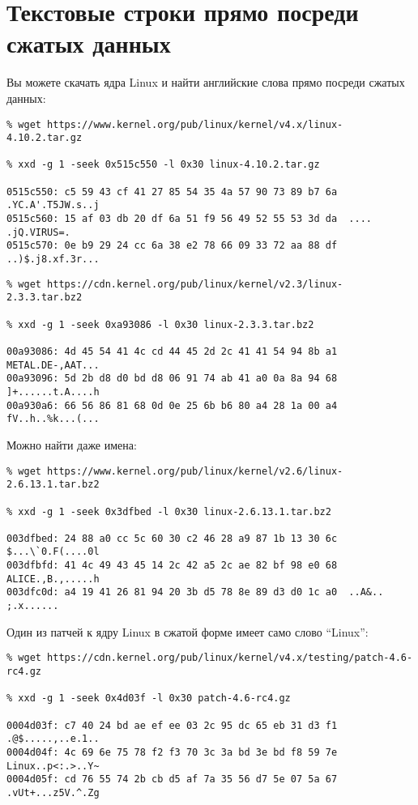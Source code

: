 \section{Текстовые строки прямо посреди сжатых данных}

Вы можете скачать ядра Linux и найти английские слова прямо посреди сжатых данных:

\begin{lstlisting}
% wget https://www.kernel.org/pub/linux/kernel/v4.x/linux-4.10.2.tar.gz

% xxd -g 1 -seek 0x515c550 -l 0x30 linux-4.10.2.tar.gz

0515c550: c5 59 43 cf 41 27 85 54 35 4a 57 90 73 89 b7 6a  .YC.A'.T5JW.s..j
0515c560: 15 af 03 db 20 df 6a 51 f9 56 49 52 55 53 3d da  .... .jQ.VIRUS=.
0515c570: 0e b9 29 24 cc 6a 38 e2 78 66 09 33 72 aa 88 df  ..)$.j8.xf.3r...
\end{lstlisting}

\begin{lstlisting}
% wget https://cdn.kernel.org/pub/linux/kernel/v2.3/linux-2.3.3.tar.bz2

% xxd -g 1 -seek 0xa93086 -l 0x30 linux-2.3.3.tar.bz2

00a93086: 4d 45 54 41 4c cd 44 45 2d 2c 41 41 54 94 8b a1  METAL.DE-,AAT...
00a93096: 5d 2b d8 d0 bd d8 06 91 74 ab 41 a0 0a 8a 94 68  ]+......t.A....h
00a930a6: 66 56 86 81 68 0d 0e 25 6b b6 80 a4 28 1a 00 a4  fV..h..%k...(...
\end{lstlisting}

Можно найти даже имена:

\begin{lstlisting}
% wget https://www.kernel.org/pub/linux/kernel/v2.6/linux-2.6.13.1.tar.bz2

% xxd -g 1 -seek 0x3dfbed -l 0x30 linux-2.6.13.1.tar.bz2

003dfbed: 24 88 a0 cc 5c 60 30 c2 46 28 a9 87 1b 13 30 6c  $...\`0.F(....0l
003dfbfd: 41 4c 49 43 45 14 2c 42 a5 2c ae 82 bf 98 e0 68  ALICE.,B.,.....h
003dfc0d: a4 19 41 26 81 94 20 3b d5 78 8e 89 d3 d0 1c a0  ..A&.. ;.x......
\end{lstlisting}

Один из патчей к ядру Linux в сжатой форме имеет само слово ``Linux'':

\begin{lstlisting}
% wget https://cdn.kernel.org/pub/linux/kernel/v4.x/testing/patch-4.6-rc4.gz

% xxd -g 1 -seek 0x4d03f -l 0x30 patch-4.6-rc4.gz

0004d03f: c7 40 24 bd ae ef ee 03 2c 95 dc 65 eb 31 d3 f1  .@$.....,..e.1..
0004d04f: 4c 69 6e 75 78 f2 f3 70 3c 3a bd 3e bd f8 59 7e  Linux..p<:.>..Y~
0004d05f: cd 76 55 74 2b cb d5 af 7a 35 56 d7 5e 07 5a 67  .vUt+...z5V.^.Zg
\end{lstlisting}

